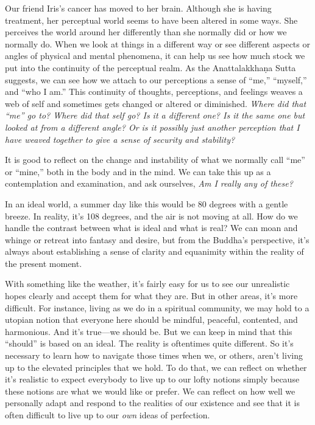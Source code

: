 Our friend Iris's cancer has moved to her brain. Although she is having 
treatment, her perceptual world seems to have been altered in some 
ways. She perceives the world around her differently than she normally 
did or how we normally do. When we look at things in a different way or 
see different aspects or angles of physical and mental phenomena, it 
can help us see how much stock we put into the continuity of the 
perceptual realm. As the Anattalakkhaṇa Sutta suggests, we can see 
how we attach to our perceptions a sense of ``me,'' ``myself,'' and 
``who I am.'' This continuity of thoughts, perceptions, and feelings 
weaves a web of self and sometimes gets changed or altered or 
diminished. \emph{Where did that ``me'' go to? Where did that self go? 
Is it a different one? Is it the same one but looked at from a 
different angle? Or is it possibly just another perception that I have 
weaved together to give a sense of security and stability?}

It is good to reflect on the change and instability of what we normally 
call ``me'' or ``mine,'' both in the body and in the mind. We can take 
this up as a contemplation and examination, and ask ourselves, \emph{Am 
I really any of these?}


In an ideal world, a summer day like this would be 80 degrees with a 
gentle breeze. In reality, it's 108 degrees, and the air is not moving 
at all. How do we handle the contrast between what is ideal and what is 
real? We can moan and whinge or retreat into fantasy and desire, but 
from the Buddha's perspective, it's always about establishing a sense 
of clarity and equanimity within the reality of the present moment.

With something like the weather, it's fairly easy for us to see our 
unrealistic hopes clearly and accept them for what they are. But in 
other areas, it's more difficult. For instance, living as we do in a 
spiritual community, we may hold to a utopian notion that everyone here 
should be mindful, peaceful, contented, and harmonious. And it's 
true---we should be. But we can keep in mind that this ``should'' is 
based on an ideal. The reality is oftentimes quite different. So it's 
necessary to learn how to navigate those times when we, or others, 
aren't living up to the elevated principles that we hold. To do that, 
we can reflect on whether it's realistic to expect everybody to live up 
to our lofty notions simply because these notions are what we would 
like or prefer. We can reflect on how well we personally adapt and 
respond to the realities of our existence and see that it is often 
difficult to live up to our \emph{own} ideas of perfection.

